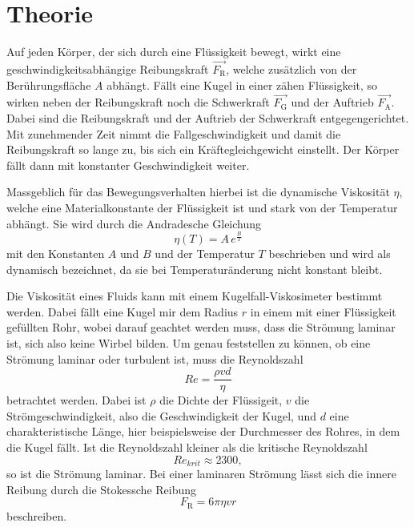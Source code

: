 \section{Theorie}
\label{sec:Theorie}
Auf jeden Körper, der sich durch eine Flüssigkeit bewegt, wirkt eine
geschwindigkeitsabhängige Reibungskraft $\vec{F_\text{R}}$, welche zusätzlich
von der Berührungsfläche $A$ abhängt. Fällt eine Kugel in einer zähen Flüssigkeit,
so wirken neben der Reibungskraft noch die Schwerkraft $\vec{F_\text{G}}$ und
der Auftrieb $\vec{F_\text{A}}$. Dabei sind die Reibungskraft und der Auftrieb
der Schwerkraft entgegengerichtet. Mit zunehmender Zeit nimmt die Fallgeschwindigkeit
und damit die Reibungskraft so lange zu, bis sich ein Kräftegleichgewicht einstellt.
Der Körper fällt dann mit konstanter Geschwindigkeit weiter.

Massgeblich für das Bewegungsverhalten hierbei ist die dynamische Viskosität
$\eta$, welche eine Materialkonstante der Flüssigkeit ist und stark von der
Temperatur abhängt. Sie wird durch die Andradesche Gleichung
\begin{equation}
  \eta(T) = A\, e^{\frac{B}{T}}
  \label{eqn:andradesche_gleichung}
\end{equation}
mit den Konstanten $A$ und $B$ und der Temperatur $T$ beschrieben und wird als
dynamisch bezeichnet, da sie bei Temperaturänderung nicht konstant bleibt.

Die Viskosität eines Fluids kann mit einem Kugelfall-Viskosimeter bestimmt werden.
Dabei fällt eine Kugel mir dem Radius $r$ in einem mit einer Flüssigkeit
gefüllten Rohr, wobei darauf geachtet werden muss, dass die Strömung laminar ist,
sich also keine Wirbel bilden. Um genau feststellen zu können, ob eine Strömung
laminar oder turbulent ist, muss die Reynoldszahl
\begin{equation}
  Re = \frac{\rho v d}{\eta}
  \label{eqn:reynoldszahl}
\end{equation}
betrachtet werden. Dabei ist $\rho$ die Dichte der Flüssigeit, $v$ die
Strömgeschwindigkeit, also die Geschwindigkeit der Kugel, und $d$ eine
charakteristische Länge, hier beispielsweise der Durchmesser des Rohres, in dem
die Kugel fällt. Ist die Reynoldszahl kleiner als die kritische Reynoldszahl
\begin{equation*}
  Re_{krit} \approx 2300,
\end{equation*}
so ist die Strömung laminar. Bei einer laminaren Strömung lässt sich die innere
Reibung durch die Stokessche Reibung
\begin{equation}
  F_\text{R} = 6 \pi \eta v r
  \label{eqn:stokes}
\end{equation}
beschreiben.

